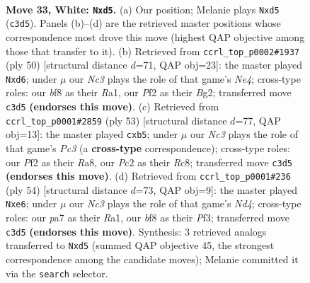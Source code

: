 \documentclass[11pt]{article}
\begin{document}
\clearpage

\begin{figure}[p]\centering
\begin{subfigure}{0.46\textwidth}\centering
\resizebox{\linewidth}{!}{%
\newchessgame
\chessboard[
  setfen={r3rb2/ppp4k/5pp1/3q3p/P7/2N3P1/RPP2P1P/6K1 w - - 0 33},
  showmover=false,
  pgfstyle=straightmove, color=movearrow, markmove={c3-d5}
]}
\caption{}
\end{subfigure}\hfill
\begin{subfigure}{0.46\textwidth}\centering
\resizebox{\linewidth}{!}{%
\newchessgame
\chessboard[
  setfen={2b2rk1/p4pp1/3q3p/8/4N2P/3n2P1/P4PB1/R5K1 w - - 0 26},
  showmover=false,
  pgfstyle=straightmove, color=movearrow, markmove={e4-d6}
]}
\caption{}
\end{subfigure}
\\[4pt]
\begin{subfigure}{0.46\textwidth}\centering
\resizebox{\linewidth}{!}{%
\newchessgame
\chessboard[
  setfen={r1r3k1/5p1p/2p3p1/1Q6/p7/P1P5/1P3PP1/R3R1K1 b - - 0 27},
  showmover=false,
  pgfstyle=straightmove, color=movearrow, markmove={c6-b5}
]}
\caption{}
\end{subfigure}\hfill
\begin{subfigure}{0.46\textwidth}\centering
\resizebox{\linewidth}{!}{%
\newchessgame
\chessboard[
  setfen={1r4k1/p4ppp/1r2b3/8/p2NP3/4KP2/1PR3PP/R7 w - - 4 28},
  showmover=false,
  pgfstyle=straightmove, color=movearrow, markmove={d4-e6}
]}
\caption{}
\end{subfigure}
\caption{\textbf{Move 33, White: \texttt{Nxd5}.} (a) Our position; Melanie plays \texttt{Nxd5} (\texttt{c3d5}). Panels (b)--(d) are the retrieved master positions whose correspondence most drove this move (highest QAP objective among those that transfer to it). (b) Retrieved from \texttt{ccrl\_top\_p0002\#1937} (ply 50) [structural distance $d$=71, QAP obj=23]: the master played \texttt{Nxd6}; under $\mu$ our \emph{Nc3} plays the role of that game's \emph{Ne4}; cross-type roles: our \emph{b}f8 as their \emph{R}a1, our \emph{P}f2 as their \emph{B}g2; transferred move \texttt{c3d5} \textbf{(endorses this move)}. (c) Retrieved from \texttt{ccrl\_top\_p0001\#2859} (ply 53) [structural distance $d$=77, QAP obj=13]: the master played \texttt{cxb5}; under $\mu$ our \emph{Nc3} plays the role of that game's \emph{Pc3} (a \textbf{cross-type} correspondence); cross-type roles: our \emph{P}f2 as their \emph{R}a8, our \emph{P}c2 as their \emph{R}c8; transferred move \texttt{c3d5} \textbf{(endorses this move)}. (d) Retrieved from \texttt{ccrl\_top\_p0001\#236} (ply 54) [structural distance $d$=73, QAP obj=9]: the master played \texttt{Nxe6}; under $\mu$ our \emph{Nc3} plays the role of that game's \emph{Nd4}; cross-type roles: our \emph{p}a7 as their \emph{R}a1, our \emph{b}f8 as their \emph{P}f3; transferred move \texttt{c3d5} \textbf{(endorses this move)}. Synthesis: 3 retrieved analogs transferred to \texttt{Nxd5} (summed QAP objective 45, the strongest correspondence among the candidate moves); Melanie committed it via the \texttt{search} selector.}
\label{fig:thought-m64}
\end{figure}
\end{document}
